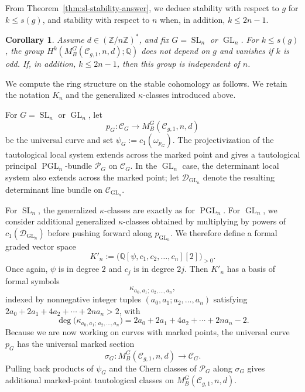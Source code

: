 \documentclass[11pt,reqno]{amsart}
\theoremstyle{plain} %
\newtheorem{corollary}[theorem]{Corollary}
\theoremstyle{definition}
\newcommand{\QQ}{\mathbb{Q}}
\newcommand{\C}{\mathcal{C}}
\newcommand{\ZZ}{\mathbb{Z}}
\DeclareMathOperator{\GL}{GL}
\DeclareMathOperator{\SL}{SL}
\DeclareMathOperator{\PGL}{PGL}
\begin{document}
    
From Theorem~\ref{thm:sl-stability-answer}, we deduce stability with respect to $g$ for $k\leq s(g)$, and stability with respect to $n$ when, in addition, $k\leq2n-1$.
 
 \begin{corollary} \label{cor:stab-G}
 Assume $d \in (\ZZ/n\ZZ)^*$, and fix $G = \SL_n$ or $\GL_n$. For $k \leq s(g)$, the group $H^k(M^{G}_B(\C_{g,1},n,d);\QQ)$ does not depend on $g$ and vanishes if $k$ is odd. If, in addition, $k \le 2n-1$, then this group is independent of $n$. 
 \end{corollary}   
    
We compute the ring structure on the stable cohomology as follows.   We retain the notation $K_n$ and the generalized $\kappa$-classes introduced above.

For $G=\SL_n$ or $\GL_n$, let
\[
p_G \colon \C_G \longrightarrow M_B^G(\C_{g,1},n,d)
\]
be the universal curve and set $\psi_G:=c_1(\omega_{p_G})$.  The projectivization of the tautological local system extends across the marked point and gives a tautological principal $\PGL_n$-bundle $\mathcal P_G$ on $\C_G$.  In the $\GL_n$ case, the determinant local system also extends across the marked point; let $\mathcal D_{\GL_n}$ denote the resulting determinant line bundle on $\C_{\GL_n}$.

For $\SL_n$, the generalized $\kappa$-classes are exactly as for $\PGL_n$. For $\GL_n$, we consider additional generalized $\kappa$-classes obtained by multiplying by powers of $c_1(\mathcal{D}_{\GL_n})$ before pushing forward along $p_{\GL_n}$. We therefore define a formal graded vector space
\begin{equation}\label{eq:K'n}
K'_n:= \big(\QQ[\psi,c_1,c_2,\ldots,c_n][2]\big)_{>0}.
\end{equation}
Once again, $\psi$ is in degree $2$ and $c_j$ is in degree $2j$. Then $K'_n$ has a basis of formal symbols
\[
\kappa_{a_0,a_1;\,a_2,\ldots,a_n},
\]
indexed by nonnegative integer tuples $(a_0,a_1; a_2,\ldots,a_n)$ satisfying $2a_0+2a_1+4a_2+\cdots+2na_n>2$, with
\[
\deg\big(\kappa_{a_0,a_1;\,a_2,\ldots,a_n}\big)=2a_0+2a_1+4a_2+\cdots+2na_n-2.
\]
Because we are now working on curves with marked points, the universal curve $p_G$ has the universal marked section $$\sigma_G \colon M_B^G(\C_{g,1}, n, d) \to \C_G.$$ Pulling back products of $\psi_G$ and the Chern classes of $\mathcal P_G$ along $\sigma_G$ gives additional marked-point tautological classes on $M_B^G(\C_{g,1}, n, d)$.
\end{document}
